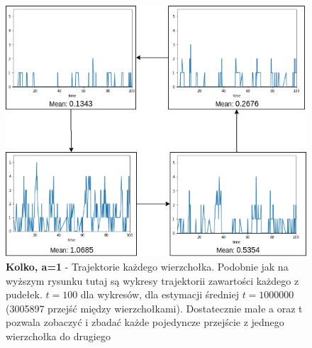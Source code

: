 \documentclass{article}
\begin{document}
\newpage
\begin{figure}[h!]
\centering
\includegraphics[width=1\linewidth]{kolko1/kolko1}
\caption{\textbf{Kolko, a=1} - Trajektorie każdego wierzchołka. \newline
Podobnie jak na wyższym rysunku tutaj są wykresy trajektorii zawartości każdego z pudełek. $t=100$ dla wykresów, dla estymacji średniej $t=1000000$ (3005897 przejść między wierzchołkami). Dostatecznie małe a oraz t pozwala zobaczyć i zbadać każde pojedyncze przejście z jednego wierzchołka do drugiego   }
\end{figure}
\end{document}
